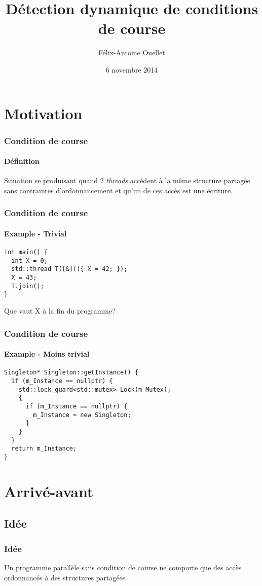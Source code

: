 \documentclass{beamer}
\author[Félix-Antoine Ouellet]{Félix-Antoine Ouellet}
\title[Sanitizer\hspace{2em}\insertframenumber/\inserttotalframenumber]{Détection dynamique de conditions de course}
\institute{Université de Sherbrooke}
\date{6 novembre 2014}
\begin{document}
\begin{frame}
\titlepage %
\end{frame}

\begin{frame}
\tableofcontents[hideallsubsections]
\end{frame}

\section{Motivation}
\begin{frame}
\frametitle{Condition de course}
\framesubtitle{Définition}
Situation se produisant quand 2 \textit{threads} accèdent à la même structure partagée sans contraintes d'ordonnancement et qu'un de ces accès est une écriture.
\end{frame}

\begin{frame}[fragile]
\frametitle{Condition de course}
\framesubtitle{Example - Trivial}
\begin{lstlisting}
int main() {
  int X = 0;
  std::thread T([&](){ X = 42; });
  X = 43;
  T.join();
}
\end{lstlisting}

Que vaut X à la fin du programme?
\end{frame}

\begin{frame}[fragile]
\frametitle{Condition de course}
\framesubtitle{Example - Moins trivial}
\begin{lstlisting}
Singleton* Singleton::getInstance() {
  if (m_Instance == nullptr) {
    std::lock_guard<std::mutex> Lock(m_Mutex);
    {
      if (m_Instance == nullptr) {
        m_Instance = new Singleton;      
      }
    }  
  }
  return m_Instance;
}
\end{lstlisting}
\end{frame}

\section{Arrivé-avant}
\subsection{Idée}
\begin{frame}
\frametitle{Idée}
Un programme parallèle sans condition de course ne comporte que des accès ordonnancés à des structures partagées
\end{frame}
\end{document}
